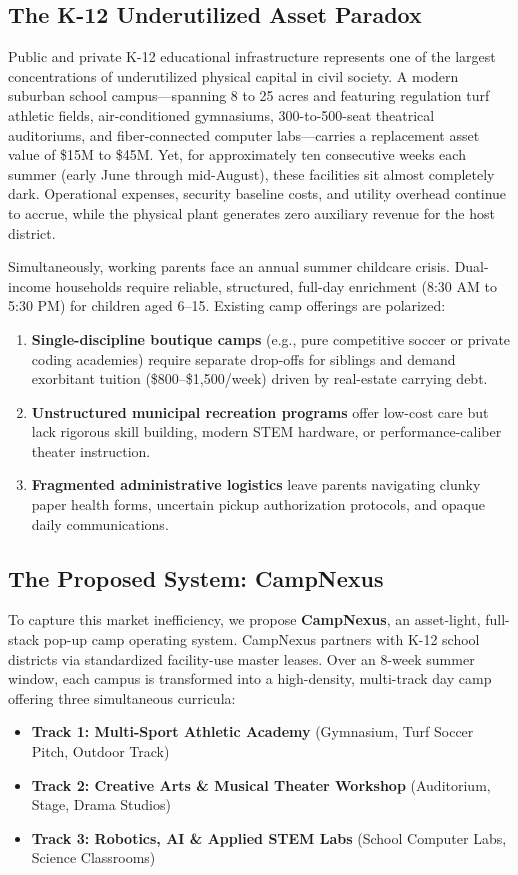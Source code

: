 \documentclass[11pt,a4paper]{article}
\begin{document}
\subsection{The K-12 Underutilized Asset Paradox}
Public and private K-12 educational infrastructure represents one of the largest concentrations of underutilized physical capital in civil society. A modern suburban school campus---spanning 8 to 25 acres and featuring regulation turf athletic fields, air-conditioned gymnasiums, 300-to-500-seat theatrical auditoriums, and fiber-connected computer labs---carries a replacement asset value of \$15M to \$45M. Yet, for approximately ten consecutive weeks each summer (early June through mid-August), these facilities sit almost completely dark. Operational expenses, security baseline costs, and utility overhead continue to accrue, while the physical plant generates zero auxiliary revenue for the host district.

Simultaneously, working parents face an annual summer childcare crisis. Dual-income households require reliable, structured, full-day enrichment (8:30 AM to 5:30 PM) for children aged 6--15. Existing camp offerings are polarized:
\begin{enumerate}
    \item \textbf{Single-discipline boutique camps} (e.g., pure competitive soccer or private coding academies) require separate drop-offs for siblings and demand exorbitant tuition (\$800--\$1,500/week) driven by real-estate carrying debt.
    \item \textbf{Unstructured municipal recreation programs} offer low-cost care but lack rigorous skill building, modern STEM hardware, or performance-caliber theater instruction.
    \item \textbf{Fragmented administrative logistics} leave parents navigating clunky paper health forms, uncertain pickup authorization protocols, and opaque daily communications.
\end{enumerate}

\subsection{The Proposed System: CampNexus}
To capture this market inefficiency, we propose \textbf{CampNexus}, an asset-light, full-stack pop-up camp operating system. CampNexus partners with K-12 school districts via standardized facility-use master leases. Over an 8-week summer window, each campus is transformed into a high-density, multi-track day camp offering three simultaneous curricula:
\begin{itemize}
    \item \textbf{Track 1: Multi-Sport Athletic Academy} (Gymnasium, Turf Soccer Pitch, Outdoor Track)
    \item \textbf{Track 2: Creative Arts \& Musical Theater Workshop} (Auditorium, Stage, Drama Studios)
    \item \textbf{Track 3: Robotics, AI \& Applied STEM Labs} (School Computer Labs, Science Classrooms)
\end{itemize}
\end{document}
